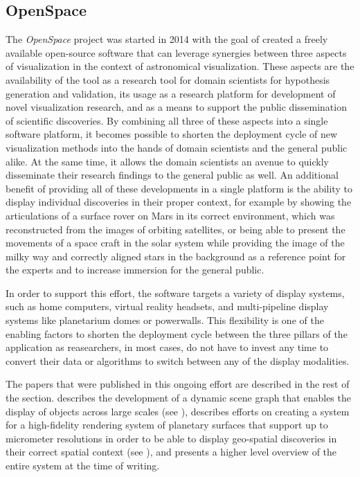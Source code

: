 \subsection{OpenSpace} \label{contributions:astro:openspace}
The \emph{OpenSpace} project was started in 2014 with the goal of created a freely available open-source software that can leverage synergies between three aspects of visualization in the context of astronomical visualization.  These aspects are the availability of the tool as a research tool for domain scientists for hypothesis generation and validation, its usage as a research platform for development of novel visualization research, and as a means to support the public dissemination of scientific discoveries.  By combining all three of these aspects into a single software platform, it becomes possible to shorten the deployment cycle of new visualization methods into the hands of domain scientists and the general public alike.  At the same time, it allows the domain scientists an avenue to quickly disseminate their research findings to the general public as well.  An additional benefit of providing all of these developments in a single platform is the ability to display individual discoveries in their proper context, for example by showing the articulations of a surface rover on Mars in its correct environment, which was reconstructed from the images of orbiting satellites, or being able to present the movements of a space craft in the solar system while providing the image of the milky way and correctly aligned stars in the background as a reference point for the experts and to  increase immersion for the general public.

In order to support this effort, the software targets a variety of display systems, such as home computers, virtual reality headsets, and multi-pipeline display systems like planetarium domes or powerwalls.  This flexibility is one of the enabling factors to shorten the deployment cycle between the three pillars of the application as reasearchers, in most cases, do not have to invest any time to convert their data or algorithms to switch between any of the display modalities.

The papers that were published in this ongoing effort are described in the rest of the section.   describes the development of a dynamic scene graph that enables the display of objects across large scales (see ),  describes efforts on creating a system for a high-fidelity rendering system of planetary surfaces that support up to micrometer resolutions in order to be able to display geo-spatial discoveries in their correct spatial context (see ), and  presents a higher level overview of the entire system at the time of writing.

